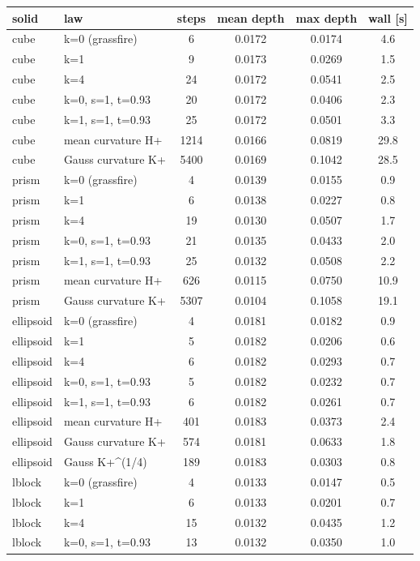 \begin{tabular}{llcccc}
\toprule
solid & law & steps & mean depth & max depth & wall [s] \\
\midrule
cube & k=0 (grassfire) & 6 & 0.0172 & 0.0174 & 4.6 \\
cube & k=1 & 9 & 0.0173 & 0.0269 & 1.5 \\
cube & k=4 & 24 & 0.0172 & 0.0541 & 2.5 \\
cube & k=0, s=1, t=0.93 & 20 & 0.0172 & 0.0406 & 2.3 \\
cube & k=1, s=1, t=0.93 & 25 & 0.0172 & 0.0501 & 3.3 \\
cube & mean curvature H+ & 1214 & 0.0166 & 0.0819 & 29.8 \\
cube & Gauss curvature K+ & 5400 & 0.0169 & 0.1042 & 28.5 \\
\midrule
prism & k=0 (grassfire) & 4 & 0.0139 & 0.0155 & 0.9 \\
prism & k=1 & 6 & 0.0138 & 0.0227 & 0.8 \\
prism & k=4 & 19 & 0.0130 & 0.0507 & 1.7 \\
prism & k=0, s=1, t=0.93 & 21 & 0.0135 & 0.0433 & 2.0 \\
prism & k=1, s=1, t=0.93 & 25 & 0.0132 & 0.0508 & 2.2 \\
prism & mean curvature H+ & 626 & 0.0115 & 0.0750 & 10.9 \\
prism & Gauss curvature K+ & 5307 & 0.0104 & 0.1058 & 19.1 \\
\midrule
ellipsoid & k=0 (grassfire) & 4 & 0.0181 & 0.0182 & 0.9 \\
ellipsoid & k=1 & 5 & 0.0182 & 0.0206 & 0.6 \\
ellipsoid & k=4 & 6 & 0.0182 & 0.0293 & 0.7 \\
ellipsoid & k=0, s=1, t=0.93 & 5 & 0.0182 & 0.0232 & 0.7 \\
ellipsoid & k=1, s=1, t=0.93 & 6 & 0.0182 & 0.0261 & 0.7 \\
ellipsoid & mean curvature H+ & 401 & 0.0183 & 0.0373 & 2.4 \\
ellipsoid & Gauss curvature K+ & 574 & 0.0181 & 0.0633 & 1.8 \\
ellipsoid & Gauss K+\^{}(1/4) & 189 & 0.0183 & 0.0303 & 0.8 \\
\midrule
lblock & k=0 (grassfire) & 4 & 0.0133 & 0.0147 & 0.5 \\
lblock & k=1 & 6 & 0.0133 & 0.0201 & 0.7 \\
lblock & k=4 & 15 & 0.0132 & 0.0435 & 1.2 \\
lblock & k=0, s=1, t=0.93 & 13 & 0.0132 & 0.0350 & 1.0 \\

\end{tabular}
